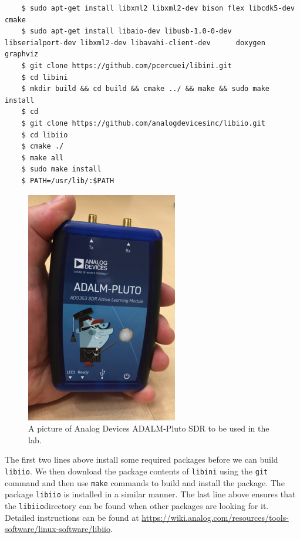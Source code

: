 \documentclass[11pt]{article}
\begin{document}
\begin{mdframed}[backgroundcolor=gray!20]
  \tiny
  \begin{verbatim}
    $ sudo apt-get install libxml2 libxml2-dev bison flex libcdk5-dev cmake
    $ sudo apt-get install libaio-dev libusb-1.0-0-dev      libserialport-dev libxml2-dev libavahi-client-dev      doxygen graphviz
    $ git clone https://github.com/pcercuei/libini.git
    $ cd libini
    $ mkdir build && cd build && cmake ../ && make && sudo make install
    $ cd 
    $ git clone https://github.com/analogdevicesinc/libiio.git
    $ cd libiio
    $ cmake ./
    $ make all
    $ sudo make install
    $ PATH=/usr/lib/:$PATH
  \end{verbatim}
\end{mdframed}

\begin{figure}
  \centering
  \includegraphics[width=.75\linewidth]{pluto_in_hand.png}
  \caption{A picture of Analog Devices ADALM-Pluto SDR to be used in the lab.}
  \label{fig:SDR_pluto}
  \end{figure}

The first two lines above install some required packages before we can build \texttt{libiio}. We then download the package contents of \texttt{libini} using the \texttt{git} command and then use \texttt{make} commands to build and install the package. The package \texttt{libiio} is installed in a similar manner. The last line above ensures that the \texttt{libiio}directory can be found when other packages are looking for it. Detailed instructions can be found at \href{https://wiki.analog.com/resources/tools-software/linux-software/libiio}{https://wiki.analog.com/resources/tools-software/linux-software/libiio}.
\end{document}
